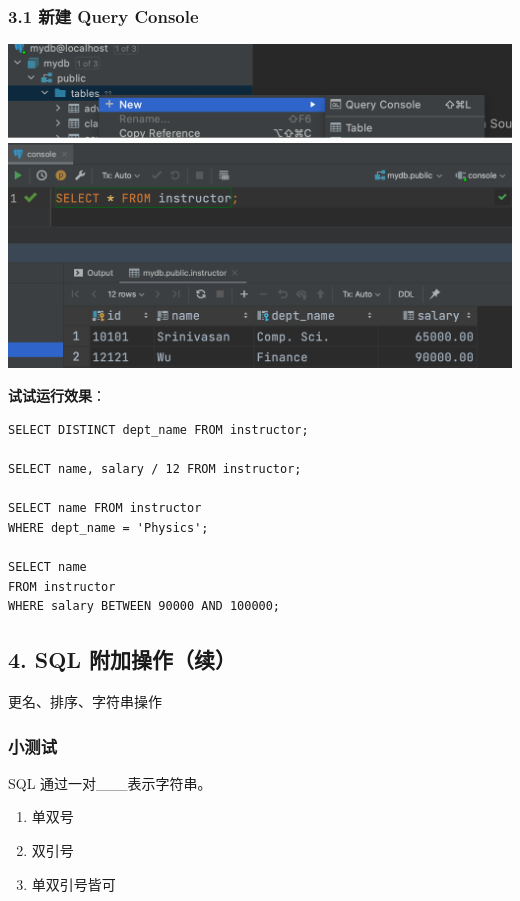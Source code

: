 \documentclass[aspectratio=169, 14pt]{beamer}
\begin{document}
\begin{frame}
    \frametitle{3.1 新建 Query Console}
    \includegraphics[height=.34\paperheight]{week4/console}  
    \pause
    \includegraphics[height=.5\paperheight]{week4/select}   

\end{frame}

\begin{frame}[fragile]
\textbf{试试运行效果}：

\begin{verbatim} 
SELECT DISTINCT dept_name FROM instructor;       

SELECT name, salary / 12 FROM instructor;

SELECT name FROM instructor
WHERE dept_name = 'Physics';

SELECT name
FROM instructor
WHERE salary BETWEEN 90000 AND 100000;
\end{verbatim}      

\end{frame}

\begin{frame}
    \section{\textcolor{darkmidnightblue}{4. SQL 附加操作（续）}}  
更名、排序、\alert{字符串操作}
\end{frame}

\begin{frame}
    \frametitle{小测试}
{
    \renewcommand{\theenumi}{\Alph{enumi}}
    SQL 通过一对\_\_\_表示字符串。
    \begin{enumerate}
        \item 单双号
        \item 双引号
        \item 单双引号皆可
    \end{enumerate}
}        

\end{frame}
\end{document}
